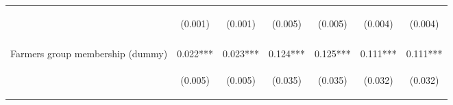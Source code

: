 \begin{center}
\begin{tabular}{lcccccc}
 & \begin{footnotesize}(0.001)\end{footnotesize} & \begin{footnotesize}(0.001)\end{footnotesize} & \begin{footnotesize}(0.005)\end{footnotesize} & \begin{footnotesize}(0.005)\end{footnotesize} & \begin{footnotesize}(0.004)\end{footnotesize} & \begin{footnotesize}(0.004)\end{footnotesize} \\
\vspace{4pt} & \begin{footnotesize}[0.004]\end{footnotesize} & \begin{footnotesize}[0.005]\end{footnotesize} & \begin{footnotesize}[0.000]\end{footnotesize} & \begin{footnotesize}[0.000]\end{footnotesize} & \begin{footnotesize}[0.000]\end{footnotesize} & \begin{footnotesize}[0.000]\end{footnotesize} \\
Farmers group membership (dummy) & 0.022*** & 0.023*** & 0.124*** & 0.125*** & 0.111*** & 0.111*** \\
 & \begin{footnotesize}(0.005)\end{footnotesize} & \begin{footnotesize}(0.005)\end{footnotesize} & \begin{footnotesize}(0.035)\end{footnotesize} & \begin{footnotesize}(0.035)\end{footnotesize} & \begin{footnotesize}(0.032)\end{footnotesize} & \begin{footnotesize}(0.032)\end{footnotesize} \\

\end{tabular}
\end{center}
